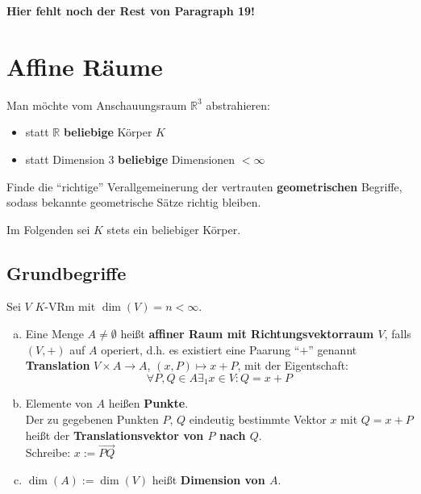 \documentclass[parskip,a4paper,twoside,DIV15,BCOR12mm]{scrbook}
\begin{document}
\textbf{\color{red}Hier fehlt noch der Rest von Paragraph 19!}

\chapter{Affine Räume}

Man möchte vom Anschauungsraum $\mathbb{R}^3$ abstrahieren:
\begin{itemize}
\item statt $\mathbb{R}$ \textbf{beliebige} Körper $K$
\item statt Dimension $3$ \textbf{beliebige} Dimensionen $< \infty$
\end{itemize}

\begin{task}
Finde die "`richtige"' Verallgemeinerung der vertrauten \textbf{geometrischen} 
Begriffe, sodass bekannte geometrische Sätze richtig bleiben.
\end{task}

Im Folgenden sei $K$ stets ein beliebiger Körper.

\section{Grundbegriffe}
\begin{definition}
Sei $V$ $K$-VRm mit $\dim(V)=n<\infty$.
\begin{enumerate}[(a)]
\item Eine Menge $A \ne \emptyset$ heißt \textbf{affiner Raum mit Richtungsvektorraum $V$},
falls $(V,+)$ auf $A$ operiert, d.h. es existiert eine Paarung "`$+$"' genannt
\textbf{Translation} $V \times A \to A$, $(x,P) \mapsto x+P$, mit der Eigentschaft:
\[\forall P,Q\in A\exists_1 x\in V: Q=x+P\]
\item Elemente von $A$ heißen \textbf{Punkte}.\\
Der zu gegebenen Punkten $P$, $Q$ eindeutig bestimmte Vektor $x$ mit $Q=x+P$ heißt
der \textbf{Translationsvektor von $P$ nach $Q$}.\\
Schreibe: $x:=\overrightarrow{PQ}$
\item $\dim(A) := \dim(V)$ heißt \textbf{Dimension von $A$}.
\end{enumerate}
\end{definition}
\end{document}
